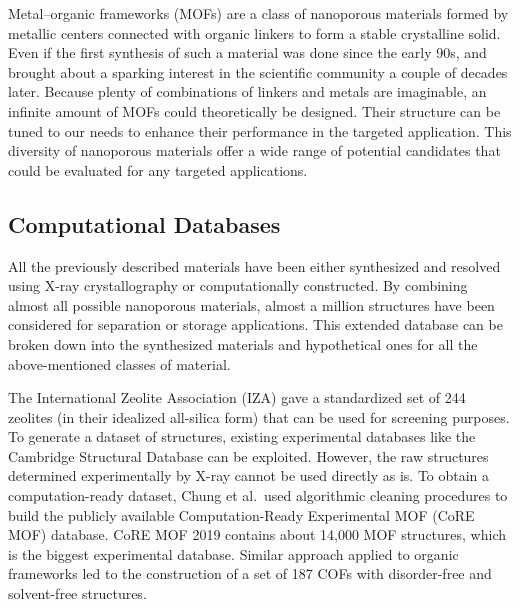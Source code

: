 \documentclass[main.tex]{subfiles}
\begin{document}
Metal--organic frameworks (MOFs) are a class of nanoporous materials formed by metallic centers connected with organic linkers to form a stable crystalline solid. Even if the first synthesis of such a material was done since the early 90s,\cite{Abrahams_1991} and brought about a sparking interest in the scientific community a couple of decades later.\cite{Kuppler_2009,Furukawa_2013} Because plenty of combinations of linkers and metals are imaginable, an infinite amount of MOFs could theoretically be designed. Their structure can be tuned to our needs to enhance their performance in the targeted application.\cite{Ejsmont_2021} This diversity of nanoporous materials offer a wide range of potential candidates that could be evaluated for any targeted applications. 


\subsection{Computational Databases}

All the previously described materials have been either synthesized and resolved using X-ray crystallography or computationally constructed. By combining almost all possible nanoporous materials, almost a million structures have been considered for separation or storage applications.\cite{Simon_2015,Simon_2015_EES,Thornton_2017} This extended database can be broken down into the synthesized materials and hypothetical ones for all the above-mentioned classes of material.

The International Zeolite Association (IZA) gave a standardized set of 244 zeolites (in their idealized all-silica form) that can be used for screening purposes. To generate a dataset of structures, existing experimental databases like the Cambridge Structural Database can be exploited. However, the raw structures determined experimentally by X-ray cannot be used directly as is. To obtain a computation-ready dataset, Chung et al.\ used algorithmic cleaning procedures to build the publicly available Computation-Ready Experimental MOF (CoRE MOF) database.\cite{Chung_2014, Chung_2019} CoRE MOF 2019 contains about 14,000 MOF structures, which is the biggest experimental database. Similar approach applied to organic frameworks led to the construction of a set of 187 COFs with disorder-free and solvent-free structures.\cite{Tong_2017,Ongari_2019}
\end{document}
